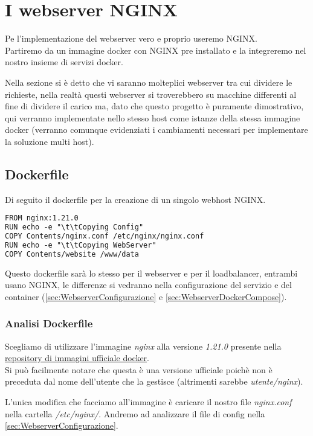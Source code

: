 \documentclass[../DocumentazioneProgetto.tex]{subfiles}
\begin{document}
	\section{I webserver NGINX}
	\label{sec:Webserver}
	Pe l'implementazione del webserver vero e proprio useremo NGINX.\\
	Partiremo da un immagine docker con NGINX pre installato e la integreremo nel nostro insieme di servizi docker.

	Nella sezione \textit{} si è detto che vi saranno molteplici webserver tra cui dividere le richieste,
	nella realtà questi webserver si troverebbero su macchine differenti al fine di dividere il carico ma, dato che questo progetto è puramente dimostrativo, qui verranno implementate nello stesso host come istanze della stessa immagine docker (verranno comunque evidenziati i cambiamenti necessari per implementare la soluzione multi host).
	\subsection{Dockerfile} 
	\label{sec:WebserverDockerfile}
	Di seguito il dockerfile per la creazione di un singolo webhost NGINX.
	\begin{lstlisting}[language=XML, caption=Dockerfile Webserver NGINX] 
FROM nginx:1.21.0
RUN echo -e "\t\tCopying Config"
COPY Contents/nginx.conf /etc/nginx/nginx.conf
RUN echo -e "\t\tCopying WebServer"
COPY Contents/website /www/data\end{lstlisting}
	Questo dockerfile sarà lo stesso per il webserver e per il loadbalancer, entrambi usano NGINX, le differenze si vedranno nella configurazione del servizio e del container (\autoref{sec:WebserverConfigurazione} e \autoref{sec:WebserverDockerCompose}).
	\subsubsection{Analisi Dockerfile} 
	Scegliamo di utilizzare l'immagine \textit{nginx} alla versione \textit{1.21.0} presente nella \href{https://hub.docker.com/_/nginx}{repository di immagini ufficiale docker}.\\ 
	Si può facilmente notare che questa è una versione ufficiale poichè non	è preceduta dal nome dell'utente che la gestisce 
	(altrimenti sarebbe \textit{utente/nginx}).

	L'unica modifica che facciamo all'immagine è caricare il nostro file \textit{nginx.conf} nella cartella \textit{/etc/nginx/}. Andremo ad analizzare il file di config nella \autoref{sec:WebserverConfigurazione}.
	
\end{document}
